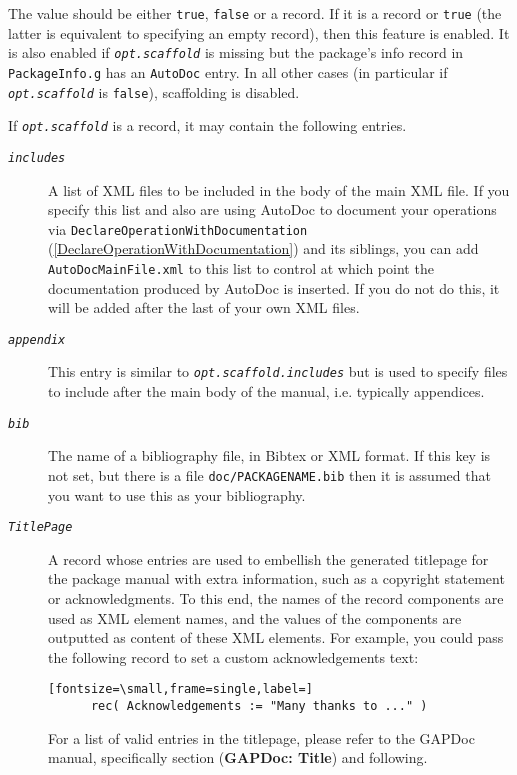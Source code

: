 \documentclass[a4paper,11pt]{report}
\begin{document}
{{{\begin{description}
\begin{description}
 The value should be either \texttt{true}, \texttt{false} or a record. If it is a record or \texttt{true} (the latter is equivalent to specifying an empty record), then this feature is
enabled. It is also enabled if \mbox{\texttt{\mdseries\slshape opt.scaffold}} is missing but the package's info record in \texttt{PackageInfo.g} has an \texttt{AutoDoc} entry. In all other cases (in particular if \mbox{\texttt{\mdseries\slshape opt.scaffold}} is \texttt{false}), scaffolding is disabled. 

 If \mbox{\texttt{\mdseries\slshape opt.scaffold}} is a record, it may contain the following entries. 
\begin{description}
\item[{\mbox{\texttt{\mdseries\slshape includes}}}]  A list of XML files to be included in the body of the main XML file. If you
specify this list and also are using \textsf{AutoDoc} to document your operations via \texttt{DeclareOperationWithDocumentation} (\ref{DeclareOperationWithDocumentation}) and its siblings, you can add \texttt{AutoDocMainFile.xml} to this list to control at which point the documentation produced by \textsf{AutoDoc} is inserted. If you do not do this, it will be added after the last of your
own XML files. 
\item[{\mbox{\texttt{\mdseries\slshape appendix}}}]  This entry is similar to \mbox{\texttt{\mdseries\slshape opt.scaffold.includes}} but is used to specify files to include after the main body of the manual,
i.e. typically appendices. 
\item[{\mbox{\texttt{\mdseries\slshape bib}}}]  The name of a bibliography file, in Bibtex or XML format. If this key is not
set, but there is a file \texttt{doc/PACKAGENAME.bib} then it is assumed that you want to use this as your bibliography. 
\item[{\mbox{\texttt{\mdseries\slshape TitlePage}}}]  A record whose entries are used to embellish the generated titlepage for the
package manual with extra information, such as a copyright statement or
acknowledgments. To this end, the names of the record components are used as
XML element names, and the values of the components are outputted as content
of these XML elements. For example, you could pass the following record to set
a custom acknowledgements text: 
\begin{Verbatim}[fontsize=\small,frame=single,label=]
      rec( Acknowledgements := "Many thanks to ..." )
\end{Verbatim}
 For a list of valid entries in the titlepage, please refer to the \textsf{GAPDoc} manual, specifically section  (\textbf{GAPDoc: Title}) and following. 
\end{description}
 

\end{description}
\end{description}}}}
\end{document}
